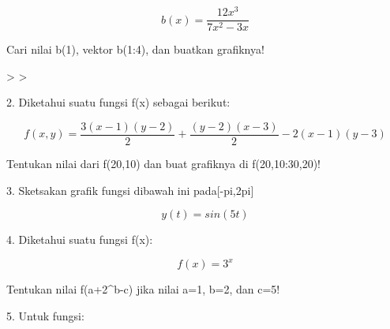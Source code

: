 \documentclass[a4paper,10pt]{article}
\begin{document}
\begin{eulernotebook}
\begin{eulercomment}
\begin{eulercomment}
\begin{eulercomment}
\begin{eulercomment}
\begin{eulercomment}
\begin{eulercomment}
\begin{eulercomment}
\begin{eulercomment}
\begin{eulercomment}
\begin{eulercomment}
\begin{eulercomment}
\begin{eulercomment}
\begin{eulercomment}
\begin{eulercomment}
\begin{eulercomment}
\begin{eulercomment}
\begin{eulercomment}
\end{eulercomment}
\begin{eulerformula}
\[
b(x)= \frac{12x^3}{7x^2-3x}
\]
\end{eulerformula}
\begin{eulercomment}
Cari nilai b(1), vektor b(1:4), dan buatkan grafiknya!
\end{eulercomment}
\begin{eulerprompt}
> 
> 
\end{eulerprompt}
\begin{eulercomment}
2. Diketahui suatu fungsi f(x) sebagai berikut:

\end{eulercomment}
\begin{eulerformula}
\[
f(x,y)=\frac{3(x-1)(y-2)}{2}+\frac{(y-2)(x-3)}{2}-2(x-1)(y-3)
\]
\end{eulerformula}
\begin{eulercomment}
Tentukan nilai dari f(20,10) dan buat grafiknya di f(20,10:30,20)!
\end{eulercomment}
\begin{eulercomment}
3. Sketsakan grafik fungsi dibawah ini pada[-pi,2pi]

\end{eulercomment}
\begin{eulerformula}
\[
y(t)=sin(5t)
\]
\end{eulerformula}
\begin{eulercomment}
4. Diketahui suatu fungsi f(x):

\end{eulercomment}
\begin{eulerformula}
\[
f(x)=3^x
\]
\end{eulerformula}
\begin{eulercomment}
Tentukan nilai f(a+2\textasciicircum{}b-c) jika nilai a=1, b=2, dan c=5!
\end{eulercomment}
\begin{eulercomment}
5. Untuk fungsi:


\end{eulercomment}
\end{eulercomment}
\end{eulercomment}
\end{eulercomment}
\end{eulercomment}
\end{eulercomment}
\end{eulercomment}
\end{eulercomment}
\end{eulercomment}
\end{eulercomment}
\end{eulercomment}
\end{eulercomment}
\end{eulercomment}
\end{eulercomment}
\end{eulercomment}
\end{eulercomment}
\end{eulercomment}
\end{eulernotebook}
\end{document}
